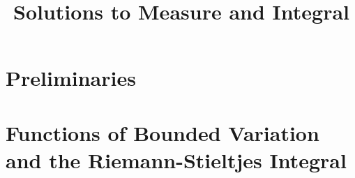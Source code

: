 \documentclass[11pt]{article}
\theoremstyle{definition}
\begin{document}
  \title{Solutions to Measure and Integral}
  \maketitle

  \section{Preliminaries}

  \section{Functions of Bounded Variation and the Riemann-Stieltjes Integral}
  
\end{document}
